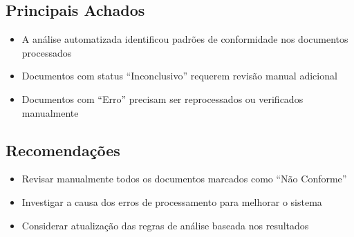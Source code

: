 \documentclass[12pt,a4paper]{article}
\begin{document}
\subsection{Principais Achados}
\begin{itemize}
    \item A an\'alise automatizada identificou padr\~oes de conformidade nos documentos processados
    \item Documentos com status ``Inconclusivo'' requerem revis\~ao manual adicional
    \item Documentos com ``Erro'' precisam ser reprocessados ou verificados manualmente
\end{itemize}

\subsection{Recomenda\c{c}\~oes}
\begin{itemize}
    \item Revisar manualmente todos os documentos marcados como ``N\~ao Conforme''
    \item Investigar a causa dos erros de processamento para melhorar o sistema
    \item Considerar atualiza\c{c}\~ao das regras de an\'alise baseada nos resultados
\end{itemize}
\end{document}
